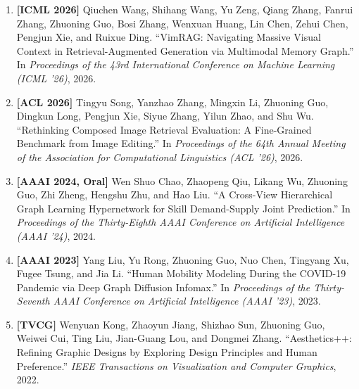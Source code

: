 \begin{enumerate}
    \item \textbf{[ICML 2026]} Qiuchen Wang, Shihang Wang, Yu Zeng, Qiang Zhang, Fanrui Zhang, Zhuoning Guo, Bosi Zhang, Wenxuan Huang, Lin Chen, Zehui Chen, Pengjun Xie, and Ruixue Ding. ``VimRAG: Navigating Massive Visual Context in Retrieval-Augmented Generation via Multimodal Memory Graph.'' In \emph{Proceedings of the 43rd International Conference on Machine Learning (ICML '26)}, 2026.

    \item \textbf{[ACL 2026]} Tingyu Song, Yanzhao Zhang, Mingxin Li, Zhuoning Guo, Dingkun Long, Pengjun Xie, Siyue Zhang, Yilun Zhao, and Shu Wu. ``Rethinking Composed Image Retrieval Evaluation: A Fine-Grained Benchmark from Image Editing.'' In \emph{Proceedings of the 64th Annual Meeting of the Association for Computational Linguistics (ACL '26)}, 2026.

    \item \textbf{[AAAI 2024, Oral]} Wen Shuo Chao, Zhaopeng Qiu, Likang Wu, Zhuoning Guo, Zhi Zheng, Hengshu Zhu, and Hao Liu. ``A Cross-View Hierarchical Graph Learning Hypernetwork for Skill Demand-Supply Joint Prediction.'' In \emph{Proceedings of the Thirty-Eighth AAAI Conference on Artificial Intelligence (AAAI '24)}, 2024.

    \item \textbf{[AAAI 2023]} Yang Liu, Yu Rong, Zhuoning Guo, Nuo Chen, Tingyang Xu, Fugee Tsung, and Jia Li. ``Human Mobility Modeling During the COVID-19 Pandemic via Deep Graph Diffusion Infomax.'' In \emph{Proceedings of the Thirty-Seventh AAAI Conference on Artificial Intelligence (AAAI '23)}, 2023.

    \item \textbf{[TVCG]} Wenyuan Kong, Zhaoyun Jiang, Shizhao Sun, Zhuoning Guo, Weiwei Cui, Ting Liu, Jian-Guang Lou, and Dongmei Zhang. ``Aesthetics++: Refining Graphic Designs by Exploring Design Principles and Human Preference.'' \emph{IEEE Transactions on Visualization and Computer Graphics}, 2022.
\end{enumerate}
